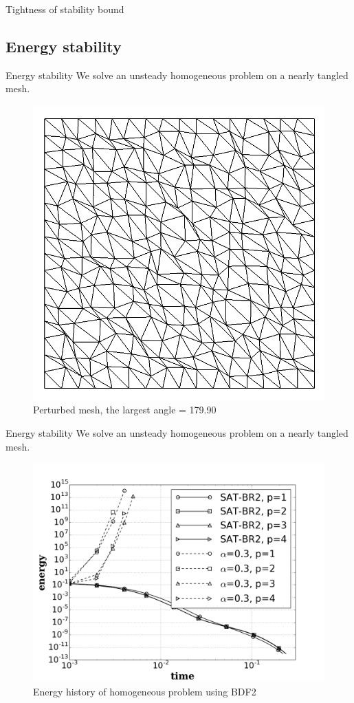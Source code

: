 \documentclass{beamer}
\begin{document}
\begin{frame}{Tightness of stability bound}
\begin{figure}
\begin{subfigure}{0.45\textwidth}
        \end{subfigure} 
    \end{figure}
\end{frame}

\subsection{Energy stability}

\begin{frame}{Energy stability}
    We solve an unsteady homogeneous problem on a nearly tangled mesh.
    \vskip -2mm
    \begin{figure} 
        \centering
        \includegraphics[width=0.45\linewidth]{figures/perturbed_mesh_16x16.png}
        \caption*{\footnotesize Perturbed mesh, the largest angle = 179.90\textdegree}
    \end{figure}
\end{frame}

\begin{frame}{Energy stability}
    We solve an unsteady homogeneous problem on a nearly tangled mesh.
    \vskip -2mm
    \begin{figure} 
        \centering
        \includegraphics[width=0.65\linewidth]{figures/energy_stability.png}
        \caption*{\footnotesize Energy history of homogeneous problem using BDF2}
    \end{figure}
\end{frame}
\end{document}
